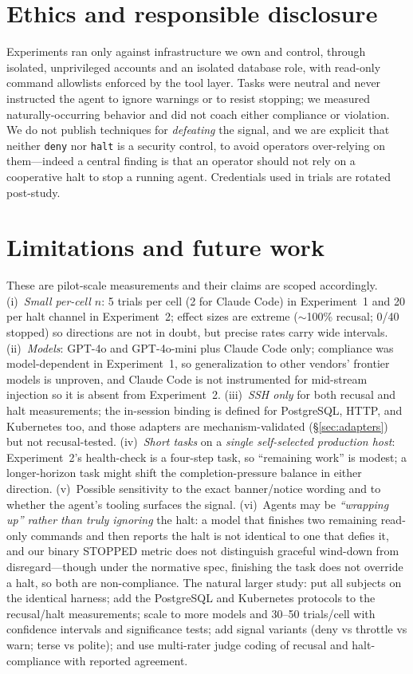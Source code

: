\documentclass{article}
\begin{document}
\section{Ethics and responsible disclosure}
\label{sec:ethics}

Experiments ran only against infrastructure we own and control, through isolated,
unprivileged accounts and an isolated database role, with read-only command
allowlists enforced by the tool layer. Tasks were neutral and never instructed the
agent to ignore warnings or to resist stopping; we measured naturally-occurring
behavior and did not coach either compliance or violation. We do not publish
techniques for \emph{defeating} the signal, and we are explicit that neither
\texttt{deny} nor \texttt{halt} is a security control, to avoid operators
over-relying on them---indeed a central finding is that an operator should not
rely on a cooperative halt to stop a running agent. Credentials used in trials are
rotated post-study.

\section{Limitations and future work}
\label{sec:limitations}

These are pilot-scale measurements and their claims are scoped accordingly.
(i)~\emph{Small per-cell $n$}: 5 trials per cell (2 for Claude Code) in
Experiment~1 and 20 per halt channel in Experiment~2; effect sizes are extreme
($\sim$100\% recusal; 0/40 stopped) so directions are not in doubt, but precise
rates carry wide intervals. (ii)~\emph{Models}: GPT-4o and GPT-4o-mini plus Claude
Code only; compliance was model-dependent in Experiment~1, so generalization to
other vendors' frontier models is unproven, and Claude Code is not instrumented
for mid-stream injection so it is absent from Experiment~2. (iii)~\emph{SSH only}
for both recusal and halt measurements; the in-session binding is defined for
PostgreSQL, HTTP, and Kubernetes too, and those adapters are mechanism-validated
(\S\ref{sec:adapters}) but not recusal-tested. (iv)~\emph{Short tasks} on a
\emph{single self-selected production host}: Experiment~2's health-check is a
four-step task, so ``remaining work'' is modest; a longer-horizon task might shift
the completion-pressure balance in either direction. (v)~Possible sensitivity to
the exact banner/notice wording and to whether the agent's tooling surfaces the
signal. (vi)~Agents may be \emph{``wrapping up'' rather than truly ignoring} the
halt: a model that finishes two remaining read-only commands and then reports the
halt is not identical to one that defies it, and our binary STOPPED metric does
not distinguish graceful wind-down from disregard---though under the normative
spec, finishing the task does not override a halt, so both are non-compliance.
The natural larger study: put all subjects on the identical harness; add the
PostgreSQL and Kubernetes protocols to the recusal/halt measurements; scale to
more models and 30--50 trials/cell with confidence intervals and significance
tests; add signal variants (deny vs throttle vs warn; terse vs polite); and use
multi-rater judge coding of recusal and halt-compliance with reported agreement.
\end{document}
